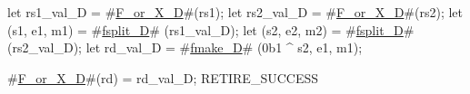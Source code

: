 let rs1_val_D    = #\hyperref[sailRISCVzFzyorzyXzyD]{F\_or\_X\_D}#(rs1);
let rs2_val_D    = #\hyperref[sailRISCVzFzyorzyXzyD]{F\_or\_X\_D}#(rs2);
let (s1, e1, m1) = #\hyperref[sailRISCVzfsplitzyD]{fsplit\_D}# (rs1_val_D);
let (s2, e2, m2) = #\hyperref[sailRISCVzfsplitzyD]{fsplit\_D}# (rs2_val_D);
let rd_val_D     = #\hyperref[sailRISCVzfmakezyD]{fmake\_D}# (0b1 ^ s2, e1, m1);

#\hyperref[sailRISCVzFzyorzyXzyD]{F\_or\_X\_D}#(rd) = rd_val_D;
RETIRE_SUCCESS

